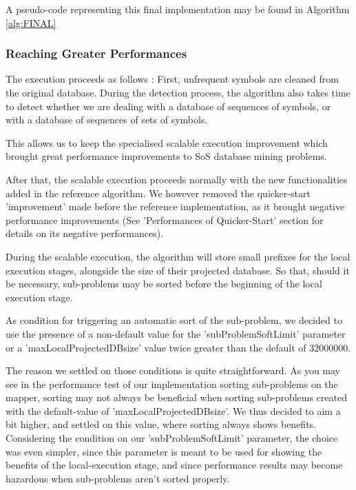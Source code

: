 \documentclass{eplmastersthesis}
\begin{document}
A pseudo-code representing this final implementation may be found in Algorithm \ref{alg:FINAL}

\subsubsection{Reaching Greater Performances}

The execution proceeds as follows : First, unfrequent symbols are cleaned from the original database. During the detection process, the algorithm also takes time to detect whether we are dealing with a database of sequences of symbols, or with a database of sequences of sets of symbols.\newline

This allows us to keep the specialised scalable execution improvement which brought great performance improvements to SoS database mining problems. \newline

After that, the scalable execution proceeds normally with the new functionalities added in the reference algorithm. We however removed the quicker-start 'improvement' made before the reference implementation, as it brought negative performance improvements (See 'Performances of Quicker-Start' section for details on its negative performances). \newline

During the scalable execution, the algorithm will store small prefixes for the local execution stages, alongside the size of their projected database. So that, should it be necessary, sub-problems may be sorted before the beginning of the local execution stage. \newline

As condition for triggering an automatic sort of the sub-problem, we decided to use the presence of a non-default value for the 'subProblemSoftLimit' parameter or a 'maxLocalProjectedDBsize' value twice greater than the default of 32000000. \newline

The reason we settled on those conditions is quite straightforward. As you may see in the performance test of our implementation sorting sub-problems on the mapper, sorting may not always be beneficial when sorting sub-problems created with the default-value of 'maxLocalProjectedDBsize'. We thus decided to aim a bit higher, and settled on this value, where sorting always shows benefits. \\
Considering the condition on our 'subProblemSoftLimit' parameter, the choice was even simpler, since this parameter is meant to be used for showing the benefits of the local-execution stage, and since performance results may become hazardous when sub-problems aren't sorted properly. \newline
\end{document}
